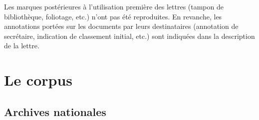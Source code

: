 \documentclass{book}
\begin{document}
\par Les marques postérieures à l’utilisation première des lettres (tampon de bibliothèque, foliotage, etc.) n’ont pas été reproduites. En revanche, les annotations portées sur les documents par leurs destinataires (annotation de secrétaire, indication de classement initial, etc.) sont indiquées dans la description de la lettre.

\section*{Le corpus}
\subsection*{Archives nationales}

\hypertarget{CoEg_Mariette_ms_002}{}
\end{document}
